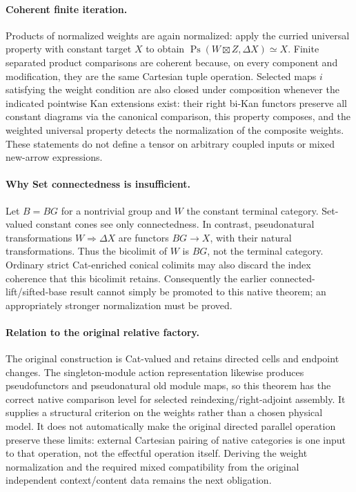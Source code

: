 \documentclass{article}
\begin{document}
\paragraph{Coherent finite iteration.} Products of normalized weights are again normalized: apply the curried universal property with constant target $X$ to obtain $\operatorname{Ps}(W\boxtimes Z,\Delta X)\simeq X$. Finite separated product comparisons are coherent because, on every component and modification, they are the same Cartesian tuple operation. Selected maps $i$ satisfying the weight condition are also closed under composition whenever the indicated pointwise Kan extensions exist: their right bi-Kan functors preserve all constant diagrams via the canonical comparison, this property composes, and the weighted universal property detects the normalization of the composite weights. These statements do not define a tensor on arbitrary coupled inputs or mixed new-arrow expressions.

\paragraph{Why Set connectedness is insufficient.} Let $B=BG$ for a nontrivial group and $W$ the constant terminal category. Set-valued constant cones see only connectedness. In contrast, pseudonatural transformations $W\Rightarrow\Delta X$ are functors $BG\to X$, with their natural transformations. Thus the bicolimit of $W$ is $BG$, not the terminal category. Ordinary strict Cat-enriched conical colimits may also discard the index coherence that this bicolimit retains. Consequently the earlier connected-lift/sifted-base result cannot simply be promoted to this native theorem; an appropriately stronger normalization must be proved.

\paragraph{Relation to the original relative factory.} The original construction is Cat-valued and retains directed cells and endpoint changes. The singleton-module action representation likewise produces pseudofunctors and pseudonatural old module maps, so this theorem has the correct native comparison level for selected reindexing/right-adjoint assembly. It supplies a structural criterion on the weights rather than a chosen physical model. It does not automatically make the original directed parallel operation preserve these limits: external Cartesian pairing of native categories is one input to that operation, not the effectful operation itself. Deriving the weight normalization and the required mixed compatibility from the original independent context/content data remains the next obligation.
\end{document}
